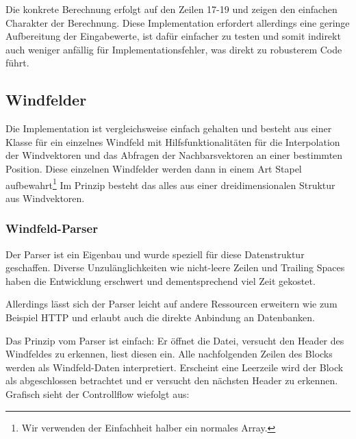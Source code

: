  
Die konkrete Berechnung erfolgt auf den Zeilen 17-19 und zeigen den einfachen
Charakter der Berechnung. Diese Implementation erfordert allerdings eine
geringe Aufbereitung der Eingabewerte, ist dafür einfacher zu testen und somit
indirekt auch weniger anfällig für Implementationsfehler, was direkt zu
robusterem Code führt.

\subsection{Windfelder}
Die Implementation ist vergleichsweise einfach gehalten und besteht aus einer
Klasse für ein einzelnes Windfeld mit Hilfsfunktionalitäten für die
Interpolation der Windvektoren und das Abfragen der Nachbarsvektoren an einer
bestimmten Position. Diese einzelnen Windfelder werden dann in einem Art Stapel
aufbewahrt\footnote{Wir verwenden der Einfachheit halber ein normales Array.}
Im Prinzip besteht das alles aus einer dreidimensionalen Struktur aus
Windvektoren.

\subsubsection{Windfeld-Parser}
Der Parser ist ein Eigenbau und wurde speziell für diese Datenstruktur
geschaffen. Diverse Unzulänglichkeiten wie nicht-leere Zeilen und Trailing
Spaces haben die Entwicklung erschwert und dementsprechend viel Zeit gekostet.

Allerdings lässt sich der Parser leicht auf andere Ressourcen erweitern wie zum
Beispiel HTTP und erlaubt auch die direkte Anbindung an Datenbanken.

Das Prinzip vom Parser ist einfach: Er öffnet die Datei, versucht den Header
des Windfeldes zu erkennen, liest diesen ein. Alle nachfolgenden Zeilen des
Blocks werden als Windfeld-Daten interpretiert. Erscheint eine Leerzeile wird
der Block als abgeschlossen betrachtet und er versucht den nächsten Header zu
erkennen. Grafisch sieht der Controllflow wiefolgt aus:

